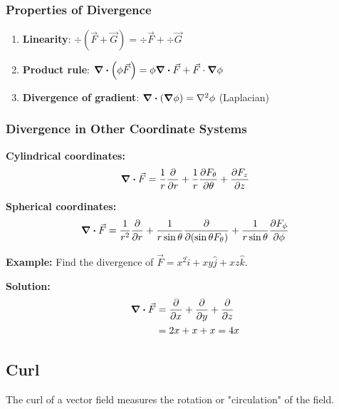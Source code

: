 \documentclass[12pt,a4paper]{article}
\begin{document}
\subsubsection{Properties of Divergence}
\begin{enumerate}
    \item \textbf{Linearity}: $\div(\vec{F} + \vec{G}) = \div\vec{F} + \div\vec{G}$
    \item \textbf{Product rule}: $\div(\phi\vec{F}) = \phi\div\vec{F} + \vec{F} \cdot \grad\phi$
    \item \textbf{Divergence of gradient}: $\div(\grad\phi) = \laplacian\phi$ (Laplacian)
\end{enumerate}

\subsubsection{Divergence in Other Coordinate Systems}
\begin{formulabox}
\textbf{Cylindrical coordinates:}
\begin{equation}
\div \vec{F} = \frac{1}{r}\pdv{}{r}(rF_r) + \frac{1}{r}\pdv{F_\theta}{\theta} + \pdv{F_z}{z}
\end{equation}

\textbf{Spherical coordinates:}
\begin{equation}
\div \vec{F} = \frac{1}{r^2}\pdv{}{r}(r^2F_r) + \frac{1}{r\sin\theta}\pdv{}{(\sin\theta F_\theta)} + \frac{1}{r\sin\theta}\pdv{F_\phi}{\phi}
\end{equation}
\end{formulabox}

\begin{examplebox}
\textbf{Example:} Find the divergence of $\vec{F} = x^2\hat{i} + xy\hat{j} + xz\hat{k}$.

\textbf{Solution:}
\begin{align}
\div\vec{F} &= \pdv{}{x}(x^2) + \pdv{}{y}(xy) + \pdv{}{z}(xz) \\
&= 2x + x + x = 4x
\end{align}
\end{examplebox}

\subsection{Curl}
The curl of a vector field measures the rotation or "circulation" of the field.
\end{document}
